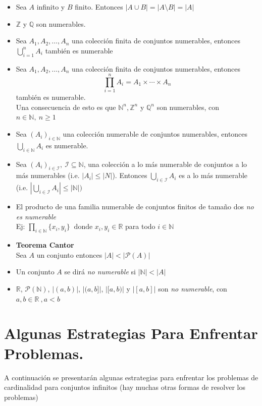 \documentclass[letterpaper,12pt]{article}
\newcommand{\Q}{\mathbb Q}
\newcommand{\R}{\mathbb R}
\newcommand{\N}{\mathbb N}
\newcommand{\Z}{\mathbb Z}
\theoremstyle{plain}
\begin{document}
{\begin{minipage}{18.5cm}
\begin{multicols}{2}
\begin{itemize}
    \item Sea $A$ infinito y $B$ finito. Entonces $|A\cup B|=|A\setminus B|=|A|$
    
    \item $\Z$ y $\Q$ son numerables.
    
    \item Sea $A_1,A_2,\dots,A_n$ una colección finita de conjuntos numerables, entonces $\displaystyle \bigcup_{i=1}^{n}A_i$ también es numerable
    
    \item Sea $A_1,A_2,\dots,A_n$ una colección finita de conjuntos numerables, entonces $$\displaystyle \prod_{i=1}^{n}A_i= A_1 \times \cdots \times A_n$$ también es numerable.\\
        Una consecuencia de esto es que $\N^n , \Z^n$ y $\Q^n$ son numerables, con $n \in \N, ~ n\geq 1$
    
    \item Sea $(A_i)_{i\in \N}$ una colección numerable de conjuntos numerables, entonces $\displaystyle \bigcup_{i\in \N}A_i$ es numerable. 
    
    \item Sea $(A_i)_{i\in \mathcal{I}},~ \mathcal{I} \subseteq \N$, una colección a lo más numerable de conjuntos a lo más numerables (i.e. $|A_i|\leq |N|$). Entonces
    $\displaystyle \bigcup_{i\in \mathcal{I}}A_i$ es a lo más numerable (i.e. $\displaystyle |\bigcup_{i\in \mathcal{I}}A_i|\leq |\N|)$
    
    \item El producto de una familia numerable de conjuntos finitos de tamaño dos \emph{no es numerable}\\
    Ej: $\displaystyle \prod_{i \in \N} \{x_i,y_i\} ~ \text{ donde } x_i,y_i \in \R$ para todo $i \in \N$
    \item \textbf{Teorema Cantor}\\Sea $A$ un conjunto entonces $|A|<|\mathcal{P}(A)|$
    \item Un conjunto $A$ se dirá \emph{no numerable}  si $|\N|<|A|$
    \item $\R$, $\mathcal{P}(\N)$, $|(a,b)|$, $|(a,b]|$, $|[a,b)|$ y $|[a,b]|$    son \emph{no numerable}, con $a,b \in \R ~,a<b$ 


\end{itemize}
\end{multicols}
\end{minipage}}

\newpage 

\section{Algunas Estrategias Para Enfrentar Problemas.}
A continuación se presentarán algunas estrategias para enfrentar los problemas de cardinalidad para conjuntos infinitos (hay muchas otras formas de resolver los problemas)
\end{document}
